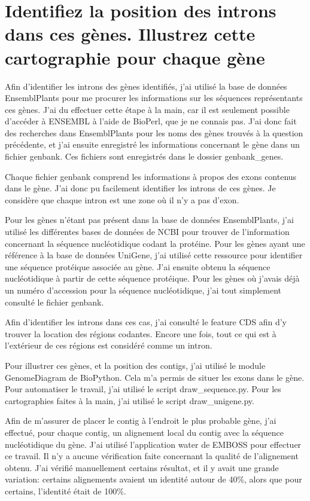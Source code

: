 \documentclass[10.9pt]{article} %
\begin{document}
\section{Identifiez la position des introns dans ces gènes. Illustrez cette cartographie pour chaque gène}

Afin d'identifier les introns des gènes identifiés, j'ai utilisé la base de données EnsemblPlants pour me
procurer les informations sur les séquences représentants ces gènes. J'ai du effectuer cette étape à la main,
car il est seulement possible d'accéder à ENSEMBL à l'aide de BioPerl, que je ne connais pas. J'ai donc fait des
recherches dans EnsemblPlants pour les noms des gènes trouvés à la question précédente, et j'ai ensuite enregistré
les informations concernant le gène dans un fichier genbank. Ces fichiers sont enregistrés dans le dossier genbank\_genes.

Chaque fichier genbank comprend les informations à propos des exons contenus dans le gène. J'ai donc pu facilement identifier
les introns de ces gènes. Je considère que chaque intron est une zone où il n'y a pas d'exon.

Pour les gènes n'étant pas présent dans la base de données EnsemblPlants, j'ai utilisé les différentes bases de données de NCBI
pour trouver de l'information concernant la séquence nucléotidique codant la protéine. Pour les gènes ayant une référence à la
base de données UniGene, j'ai utilisé cette ressource pour identifier une séquence protéique associée au gène. J'ai ensuite
obtenu la séquence nucléotidique à partir de cette séquence protéique. Pour les gènes où j'avais déjà un numéro d'accession pour
la séquence nucléotidique, j'ai tout simplement consulté le fichier genbank.

Afin d'identifier les introns dans ces cas, j'ai consulté le feature CDS afin d'y trouver la location des régions codantes. Encore
une fois, tout ce qui est à l'extérieur de ces régions est considéré comme un intron.

Pour illustrer ces gènes, et la position des contigs, j'ai utilisé le module GenomeDiagram de BioPython. Cela m'a permis de situer
les exons dans le gène. Pour automatiser le travail, j'ai utilisé le script draw\_sequence.py. Pour les cartographies faites à la
main, j'ai utilisé le script draw\_unigene.py.

Afin de m'assurer de placer le contig à l'endroit le plus probable gène, j'ai effectué, pour chaque contig, un alignement local du
contig avec la séquence nucléotidique du gène. J'ai utilisé l'application water de EMBOSS pour effectuer ce travail. Il n'y a aucune
vérification faite concernant la qualité de l'alignement obtenu. J'ai vérifié manuellement certains résultat, et il y avait une
grande variation: certains alignements avaient un identité autour de 40\%, alors que pour certains, l'identité était de 100\%.
\end{document}
